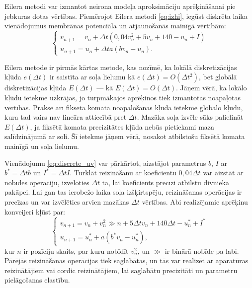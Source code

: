 Eilera metodi \cite{burden2011} var izmantot neirona modeļa aproksimāciju aprēķināšanai pie jebkuras dotas vērtības. Piemērojot Eilera metodi \eqref{eq:izhi}, iegūst diskrēta laika vienādojumus membrānas potenciāla un atjaunošanās mainīgā vērtībām:
\begin{equation}
  \label{eq:discrete_uv}
  \begin{cases}
  v_{n + 1} = v_{n} + \Delta t(0{,}04v_{n}^{2} + 5v_{n} + 140 - u_{n} + I) \\
  u_{n + 1} = u_{n} + \Delta ta(bv_{n} - u_{n}).
  \end{cases}
\end{equation}

Eilera metode ir pirmās kārtas metode, kas nozīmē, ka lokālā diskretizācijas kļūda \(e(\Delta t)\) ir saistīta ar soļa lielumu kā \(e(\Delta t)=O(\Delta t^2)\), bet globālā diskretizācijas kļūda \(E(\Delta t)\) — kā \(E(\Delta t)=O(\Delta t)\). Jāņem vērā, ka lokālo kļūdu ietekme uzkrājas, jo turpmākajos aprēķinos tiek izmantotas noapaļotas vērtības. Praksē arī fiksētā komata noapaļošanas kļūda ietekmē globālo kļūdu, kura tad vairs nav lineāra attiecībā pret \(\Delta t\). Mazāka soļa izvēle sāks palielināt \(E(\Delta t)\), ja fiksētā komata precizitātes kļūda nebūs pietiekami maza salīdzinājumā ar soli. Šī ietekme jāņem vērā, nosakot atbilstošu fiksētā komata mainīgā un soļa lielumu.

Vienādojumu \eqref{eq:discrete_uv} var pārkārtot, aizstājot parametrus \(b\), \(I\) ar \(b^{*}=\Delta tb\) un \(I^{*}=\Delta tI\). Turklāt reizināšanu ar koeficientu \(0{,}04\Delta t\) var aizstāt ar nobīdes operāciju, izvēloties \(\Delta t\) tā, lai koeficients precīzi atbilstu divnieka pakāpei. Lai gan tas ierobežo laika soļa izšķirtspēju, reizināšanas operācijas ir precīzas un var izvēlēties arvien mazākas \(\Delta t\) vērtības. Abi realizējamie aprēķinu konveijeri kļūst par:
\begin{equation}
\label{eq:discrete_fe_uv}
\begin{cases}
  v_{n + 1} = v_{n} + v_{n}^{2}\gg n + 5\Delta tv_{n} + 140\Delta t - u_{n}^{*} + I^{*} \\
  u_{n + 1} = u_{n}^{*} + a(b^{*}v_{n} - u_{n}^{*}),
\end{cases}
\end{equation}
kur \(n\) ir pozīciju skaits, par kuru nobīdīt \(v^{2}_{n}\), un \(\gg\) ir binārā nobīde pa labi. Pārējās reizināšanas operācijas tiek saglabātas, un tās var realizēt ar aparatūras reizinātājiem vai \Gls{cordic} reizinātājiem, lai saglabātu precizitāti un parametru pielāgošanas elastību.

